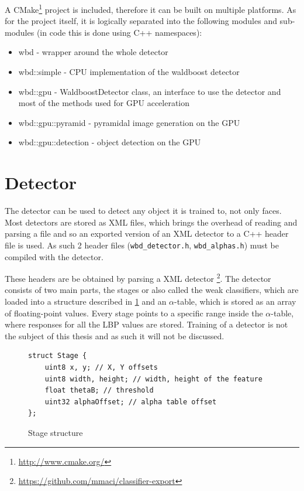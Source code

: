 A CMake\footnote{\url{http://www.cmake.org/}} project is included, therefore it can be built on multiple platforms. As for the project itself, it is logically separated into the following modules and sub-modules (in code this is done using C++ namespaces):

\begin{itemize}
	\item wbd - wrapper around the whole detector
	\item wbd::simple - CPU implementation of the waldboost detector
	\item wbd::gpu - WaldboostDetector class, an interface to use the detector and most of the methods used for GPU acceleration
	\item wbd::gpu::pyramid - pyramidal image generation on the GPU
	\item wbd::gpu::detection - object detection on the GPU
\end{itemize}

\section{Detector}\label{sec:detector}

The detector can be used to detect any object it is trained to, not only faces. Most detectors are stored as XML files, which brings the overhead of reading and parsing a file and so an exported version of an XML detector to a C++ header file is used. As such 2 header files (\verb|wbd_detector.h|, \verb|wbd_alphas.h|) must be compiled with the detector.

These headers are be obtained by parsing a XML detector \footnote{\url{https://github.com/mmaci/classifier-export}}. The detector consists of two main parts, the stages or also called the weak classifiers, which are loaded into a structure described in \ref{fig:stage} and an $\alpha$-table, which is stored as an array of floating-point values. Every stage points to a specific range inside the $\alpha$-table, where responses for all the LBP values are stored. Training of a detector is not the subject of this thesis and as such it will not be discussed.

\begin{figure}[h!]
\begin{verbatim}
struct Stage {
    uint8 x, y; // X, Y offsets
    uint8 width, height; // width, height of the feature
    float thetaB; // threshold
    uint32 alphaOffset; // alpha table offset
};
\end{verbatim}
\caption{Stage structure}
\label{fig:stage}
\end{figure}


